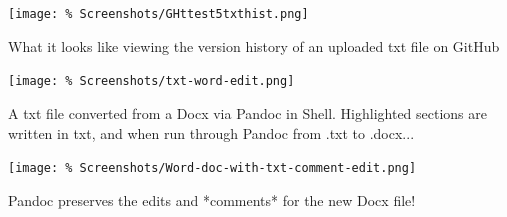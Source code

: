 \documentclass[unknownkeysallowed,usepdftitle=false, aspectratio=169, parskip=full]{beamer}
\newcommand{\secvariable}{nothing}
\newcommand{\mysection}[1]{\renewcommand{\secvariable}{#1}
}
\begin{document}
\mysection{radar}
\begin{frame}\label{\secvariable}
\begin{center}
  \vspace{-0.5cm}
 \texttt{[image: \%
  Screenshots/GHttest5txthist.png]}
\end{center}
  \vspace{-0.5cm}
  
What it looks like viewing the version history of an uploaded txt file on GitHub
\end{frame}

\mysection{line}
\begin{frame}\label{\secvariable}
\begin{center}
\texttt{[image: \%
Screenshots/txt-word-edit.png]}
\end{center}
    \parbox{\linewidth}{

A txt file converted from a Docx via Pandoc in Shell. Highlighted sections are written in txt, and when run through Pandoc from .txt to .docx...
}
\end{frame}

\mysection{major}
\begin{frame}\label{\secvariable} %
\begin{center}
  \vspace{-0.5cm}
 \texttt{[image: \%
  Screenshots/Word-doc-with-txt-comment-edit.png]}
\end{center}
  \vspace{-0.5cm}
  
    Pandoc preserves the edits and *comments* for the new Docx file!

\end{frame}

\end{document}
